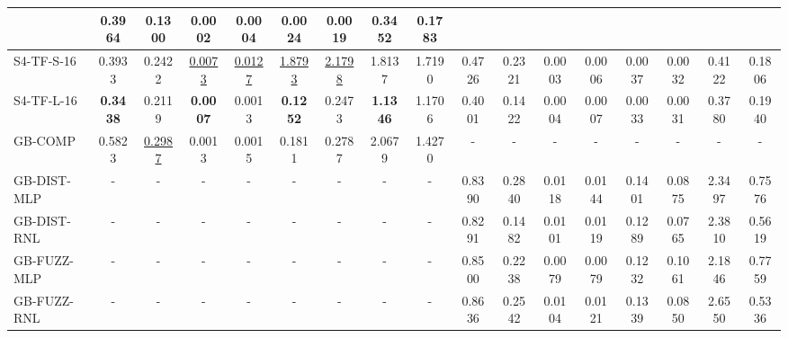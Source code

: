 \begin{table*}[h]
{\begin{tabular}{lcc|cc|cc|cc|cc|cc|cc|cc}
                & \textbf{0.3964} & \textbf{0.1300}
                & \textbf{0.0002} & \textbf{0.0004} & \textbf{0.0024} & \textbf{0.0019} & \textbf{0.3452} & 0.1783\\ 
            \midrule
            S4-TF-S-16 
                & 0.3933 & 0.2422
                & \underline{0.0073} & \underline{0.0127} & \underline{1.8793} & \underline{2.1798} & 1.8137 & 1.7190 
                & 0.4726 & 0.2321
                & 0.0003 & 0.0006 & 0.0037 & 0.0032 & 0.4122 & 0.1806\\ 
            S4-TF-L-16 
                & \textbf{0.3438} & 0.2119
                & \textbf{0.0007} & 0.0013 & \textbf{0.1252} & 0.2473 & \textbf{1.1346} & 1.1706 
                & 0.4001 & 0.1422
                & 0.0004 & 0.0007 & 0.0033 & 0.0031 & 0.3780 & 0.1940\\ 
            \midrule
            GB-COMP 
                & 0.5823 & \underline{0.2987}
                & 0.0013 & 0.0015 & 0.1811 & 0.2787 & 2.0679 & 1.4270 
                & - & -
                & - & - & - & - & - & -\\
            \midrule
            GB-DIST-MLP
                & - & -
                & - & - & - & - & - & - 
                & 0.8390 & 0.2840
                & 0.0118 & 0.0144 & 0.1401 & 0.0875 & 2.3497 & 0.7576\\
            GB-DIST-RNL 
                & - & - 
                & - & - & - & - & - & - 
                & 0.8291 & 0.1482
                & 0.0101 & 0.0119 & 0.1289 & 0.0765 & 2.3810 & 0.5619\\
            \midrule
            GB-FUZZ-MLP 
                & - & - 
                & - & - & - & - & - & - 
                & 0.8500 & 0.2238
                & 0.0079 & 0.0079 & 0.1232 & 0.1061 & 2.1846 & 0.7759\\ 
            GB-FUZZ-RNL 
                & - & - 
                & - & - & - & - & - & - 
                & 0.8636 & 0.2542
                & 0.0104 & 0.0121 & 0.1339 & 0.0850 & 2.6550 & 0.5336\\  
            \midrule
        \end{tabular}
    }
\end{table*}